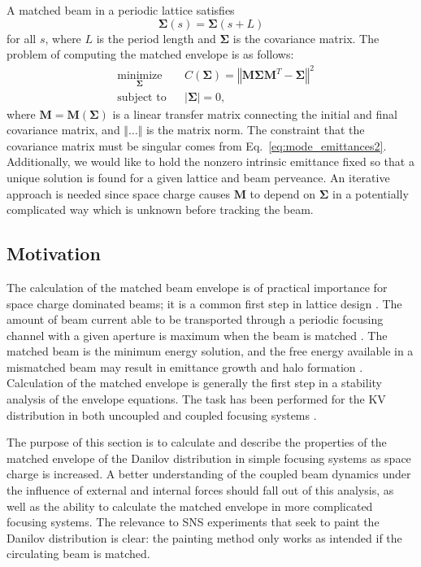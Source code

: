 A matched beam in a periodic lattice satisfies 
%
\begin{equation} \label{eq:matched_sigma}
    \bm{\Sigma}(s) = \bm{\Sigma}(s + L)
\end{equation}
%
for all $s$, where $L$ is the period length and $\bm{\Sigma}$ is the covariance matrix. The problem of computing the matched envelope is as follows:
%
\begin{equation}
\begin{aligned}
    & \underset{\bm{\Sigma}}{\text{minimize}}
    & & C(\bm{\Sigma}) = \left\Vert{\mathbf{M} \bm{\Sigma} \mathbf{M}^T - \bm{\Sigma}}\right\Vert^2 \\
    & \text{subject to}
    & & |\bm{\Sigma}| = 0,
\end{aligned}
\end{equation}
%
where $\mathbf{M} = \mathbf{M}(\bm{\Sigma})$ is a linear transfer matrix connecting the initial and final covariance matrix, and $\Vert\dots\Vert$ is the matrix norm. The constraint that the covariance matrix must be singular comes from Eq.~\eqref{eq:mode_emittances2}. Additionally, we would like to hold the nonzero intrinsic emittance fixed so that a unique solution is found for a given lattice and beam perveance. An iterative approach is needed since space charge causes $\mathbf{M}$ to depend on $\bm{\Sigma}$ in a potentially complicated way which is unknown before tracking the beam. 


\subsection{Motivation}

The calculation of the matched beam envelope is of practical importance for space charge dominated beams; it is a common first step in lattice design \cite{Lund2006}. The amount of beam current able to be transported through a periodic focusing channel with a given aperture is maximum when the beam is matched \cite{book:Reiser}. The matched beam is the minimum energy solution, and the free energy available in a mismatched beam may result in emittance growth and halo formation \cite{book:Reiser}. Calculation of the matched envelope is generally the first step in a stability analysis of the envelope equations. The task has been performed for the KV distribution in both uncoupled and coupled focusing systems \cite{Hofmann1983, Chernin1988, Ryne1995, Lund2006, Anderson2007, Goswami2016}. 

The purpose of this section is to calculate and describe the properties of the matched envelope of the Danilov distribution in simple focusing systems as space charge is increased. A better understanding of the coupled beam dynamics under the influence of external and internal forces should fall out of this analysis, as well as the ability to calculate the matched envelope in more complicated focusing systems. The relevance to SNS experiments that seek to paint the Danilov distribution is clear: the painting method only works as intended if the circulating beam is matched.

